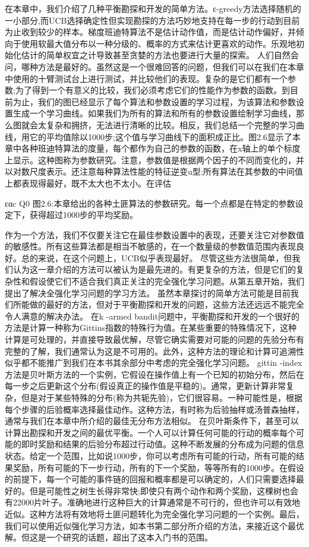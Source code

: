 在本章中，我们介绍了几种平衡勘探和开发的简单方法。ε-greedy方法选择随机的一小部分,而UCB选择确定性但实现勘探的方法巧妙地支持在每一步的行动到目前为止收到较少的样本。梯度班迪特算法不是估计动作值，而是估计动作偏好，并倾向于使用软最大值分布以一种分级的、概率的方式来估计更喜欢的动作。乐观地初始化估计的简单权宜之计导致甚至贪婪的方法也要进行大量的探索。
人们自然会问，哪种方法是最好的。虽然这是一个很难回答的问题，但我们可以在我们在本章中使用的十臂测试台上进行测试，并比较他们的表现。复杂的是它们都有一个参数;为了得到一个有意义的比较，我们必须考虑它们的性能作为参数的函数。到目前为止，我们的图已经显示了每个算法和参数设置的学习过程，为该算法和参数设置生成一个学习曲线。如果我们为所有的算法和所有的参数设置绘制学习曲线，那么图就会太复杂和拥挤，无法进行清晰的比较。相反，我们总结一个完整的学习曲线，用它的平均值除以1000步;这个值与学习曲线下的面积成正比。图2.6显示了本章中各种班迪特算法的度量，每个都作为自己的参数的函数，在x轴上的单个标度上显示。这种图称为参数研究。注意，参数值是根据两个因子的不同而变化的，并以对数尺度表示。还注意每种算法性能的特征逆变u型;所有算法在其参数的中间值上都表现得最好，既不太大也不太小。在评估

εαc Q0
图2.6:本章给出的各种土匪算法的参数研究。每一个点都是在特定的参数设定下，获得超过1000步的平均奖励。

作为一个方法，我们不仅要关注它在最佳参数设置中的表现，还要关注它对参数值的敏感性。所有这些算法都是相当不敏感的，在一个数量级的参数值范围内表现良好。总的来说，在这个问题上，UCB似乎表现最好。
尽管这些方法很简单，但我们认为这一章介绍的方法可以被认为是最先进的。有更复杂的方法，但是它们的复杂性和假设使它们不适合我们真正关注的完全强化学习问题。从第五章开始，我们提出了解决全强化学习问题的学习方法。
虽然本章探讨的简单方法可能是目前我们所能做的最好的方法，但对于平衡勘探和开发的问题，这些方法还远远不能完全令人满意的解决办法。
在k -armed bandit问题中，平衡勘探和开发的一个很好的方法是计算一种称为Gittins指数的特殊行为值。在某些重要的特殊情况下，这种计算是可处理的，并直接导致最优解，尽管它确实需要对可能的问题的先验分布有完整的了解，我们通常认为这是不可用的。此外，这种方法的理论和计算可追溯性似乎都不能推广到我们在本书其余部分中考虑的完全强化学习问题。
gittin -index方法是贝叶斯方法的一个实例，它假设在操作值上有一个已知的初始分布，然后在每一步之后更新这个分布(假设真正的操作值是平稳的)。通常，更新计算非常复杂，但是对于某些特殊的分布(称为共轭先验)，它们很容易。一种可能性是，根据每个步骤的后验概率选择最佳动作。这种方法，有时称为后验抽样或汤普森抽样，通常与我们在本章中所介绍的最佳无分布方法相似。
在贝叶斯条件下，甚至可以计算出勘探和开发之间的最优平衡。一个人可以计算任何可能的行动的概率每个可能的即时奖励和结果的后验分布超过行动值。这种不断发展的分布成为问题的信息状态。给定一个范围，比如说1000步，你可以考虑所有可能的行动，所有可能的结果奖励，所有可能的下一步行动，所有的下一个奖励，等等所有的1000步。在假设的前提下，每一个可能的事件链的回报和概率都是可以确定的，人们只需要选择最好的。但是可能性之树生长得非常快;即使只有两个动作和两个奖励，这棵树也会有22000片叶子。准确地进行这种巨大的计算通常是不可行的，但也许可以有效地近似。这种方法将有效地将土匪问题转化为完全强化学习问题的一个实例。最后，我们可以使用近似强化学习方法，如本书第二部分所介绍的方法，来接近这个最优解。但这是一个研究的话题，超出了这本入门书的范围。

